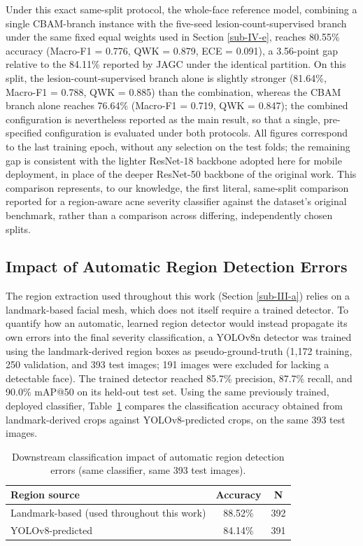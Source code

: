 \documentclass[conference]{IEEEtran}
\begin{document}
Under this exact same-split protocol, the whole-face reference model, combining a single CBAM-branch instance with the five-seed lesion-count-supervised branch under the same fixed equal weights used in Section \ref{sub-IV-e}, reaches 80.55\% accuracy (Macro-F1 = 0.776, QWK = 0.879, ECE = 0.091), a 3.56-point gap relative to the 84.11\% reported by JAGC \cite{b30} under the identical partition. On this split, the lesion-count-supervised branch alone is slightly stronger (81.64\%, Macro-F1 = 0.788, QWK = 0.885) than the combination, whereas the CBAM branch alone reaches 76.64\% (Macro-F1 = 0.719, QWK = 0.847); the combined configuration is nevertheless reported as the main result, so that a single, pre-specified configuration is evaluated under both protocols. All figures correspond to the last training epoch, without any selection on the test folds; the remaining gap is consistent with the lighter ResNet-18 backbone adopted here for mobile deployment, in place of the deeper ResNet-50 backbone of the original work. This comparison represents, to our knowledge, the first literal, same-split comparison reported for a region-aware acne severity classifier against the dataset's original benchmark, rather than a comparison across differing, independently chosen splits.

\FloatBarrier
\subsection{Impact of Automatic Region Detection Errors}\label{sub-IV-g}

The region extraction used throughout this work (Section \ref{sub-III-a}) relies on a landmark-based facial mesh, which does not itself require a trained detector. To quantify how an automatic, learned region detector would instead propagate its own errors into the final severity classification, a YOLOv8n detector \cite{b33} was trained using the landmark-derived region boxes as pseudo-ground-truth (1,172 training, 250 validation, and 393 test images; 191 images were excluded for lacking a detectable face). The trained detector reached 85.7\% precision, 87.7\% recall, and 90.0\% mAP@50 on its held-out test set. Using the same previously trained, deployed classifier, Table~\ref{tab:yolo} compares the classification accuracy obtained from landmark-derived crops against YOLOv8-predicted crops, on the same 393 test images.

\begin{table}[H]
\caption{Downstream classification impact of automatic region detection errors (same classifier, same 393 test images).}
\begin{center}
\small
\begin{tabular}{|l|c|c|}
\hline
\textbf{Region source} & \textbf{Accuracy} & \textbf{N} \\
\hline
Landmark-based (used throughout this work) & 88.52\% & 392 \\
\hline
YOLOv8-predicted & 84.14\% & 391 \\
\hline
\end{tabular}
\label{tab:yolo}
\end{center}
\end{table}
\end{document}
